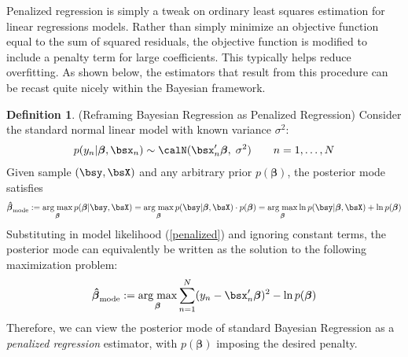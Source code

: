 \documentclass[12pt]{article}
\theoremstyle{plain}
\theoremstyle{definition}
\newtheorem{defn}[thm]{Definition}
\theoremstyle{remark}
\newcommand{\bsbeta}{\boldsymbol{\beta}}
\newcommand{\bshatbeta}{\boldsymbol{\hat{\beta}}}
\DeclareMathOperator*{\argmax}{arg\;max}
\newcommand{\sumnN}{\sum^N_{n=1}}
\begin{document}
Penalized regression is simply a tweak on ordinary least squares
estimation for linear regressions models.
Rather than simply minimize an objective function equal to the sum of
squared residuals, the objective function is modified to include a
penalty term for large coefficients.
This typically helps reduce overfitting.
As shown below, the estimators that result from this procedure can be
recast quite nicely within the Bayesian framework.

\begin{defn}(Reframing Bayesian Regression as Penalized Regression)
Consider the standard normal linear model with known variance
$\sigma^2$:
\begin{align}
  p(y_n|\bsbeta,\bsx_n)
  \sim
  \calN(\bsx_n'\bsbeta,\; \sigma^2)
  \qquad n=1,\ldots,N
  \label{penalized}
\end{align}
Given sample $(\bsy,\bsX)$ and any arbitrary prior $p(\bsbeta)$,
the posterior mode satisfies
\begin{align*}
  \bshatbeta_{\text{mode}}
  :=
  \argmax_{\bsbeta}
  p(\bsbeta|\bsy,\bsX)
  =
  \argmax_{\bsbeta}
  p(\bsy|\bsbeta,\bsX)\cdot p(\bsbeta)
  =
  \argmax_{\bsbeta}
  \ln p(\bsy|\bsbeta,\bsX)
  + \ln p(\bsbeta)
\end{align*}
Substituting in model likelihood (\ref{penalized}) and ignoring constant
terms, the posterior mode can equivalently be written as the solution to
the following maximization problem:
\begin{align*}
  \bshatbeta_{\text{mode}}
  :=
  \argmax_{\bsbeta}
  \sumnN (y_n-\bsx_n'\bsbeta)^2
  - \ln p(\bsbeta)
\end{align*}
Therefore, we can view the posterior mode of standard Bayesian
Regression as a \emph{penalized regression} estimator, with $p(\bsbeta)$
imposing the desired penalty.
\end{defn}
\end{document}
